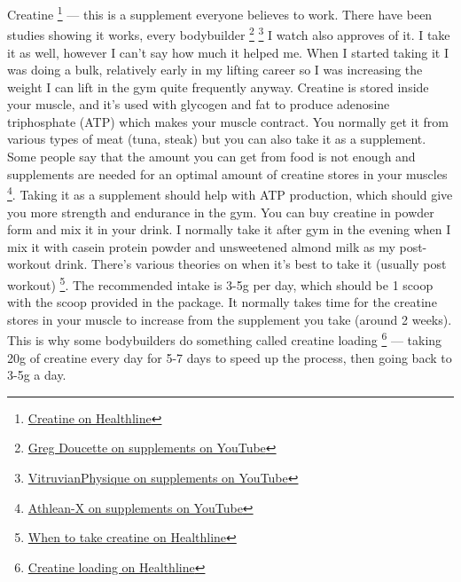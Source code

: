 \documentclass[openany, 12pt]{book}
\begin{document}
        Creatine
        \footnote{\href{https://www.healthline.com/nutrition/what-is-creatine}{Creatine on Healthline}} --- this is a supplement everyone believes to work. There have been studies
        showing it works, every bodybuilder
        \footnote{\href{https://www.youtube.com/watch?v=W9Kas49cNnU}{Greg Doucette on supplements on YouTube}}
        \footnote{\href{https://www.youtube.com/watch?v=6Xj1MNJK-iA}{VitruvianPhysique on supplements on YouTube}}
        I watch also approves of it. I take it as well, however I can't say how much it helped me. When I started taking it I was doing a bulk, relatively
        early in my lifting career so I was increasing the weight I can lift in the gym quite frequently anyway. Creatine is stored inside your muscle, and it's used with glycogen and fat to produce
        adenosine triphosphate (ATP) which makes your muscle contract. You normally get it from various types of meat (tuna, steak) but you can also take it as a supplement. Some people say that
        the amount you can get from food is not enough and supplements are needed for an optimal amount of creatine stores in your muscles
        \footnote{\href{https://www.youtube.com/watch?v=sREg8GrkPio}{Athlean-X on supplements on YouTube}}.
        Taking it as a supplement should help with ATP production, which should give you more strength and endurance in the gym.
        You can buy creatine in powder form and mix it in your drink. I normally take it after gym in the evening when I mix it with casein protein powder and unsweetened almond milk as my
        post-workout drink. There's various theories on when it's best to take it (usually post workout)
        \footnote{\href{https://www.healthline.com/nutrition/best-time-for-creatine}{When to take creatine on Healthline}}.
        The recommended intake is 3-5g per day, which should be 1 scoop with the scoop provided in the package. It normally takes time for the creatine stores in your muscle
        to increase from the supplement you take (around 2 weeks). This is why some bodybuilders do something called creatine loading
        \footnote{\href{https://www.healthline.com/nutrition/creatine-loading-phase}{Creatine loading on Healthline}} --- taking 20g of creatine every day for 5-7 days to speed up the process,
        then going back to 3-5g a day.
\end{document}

